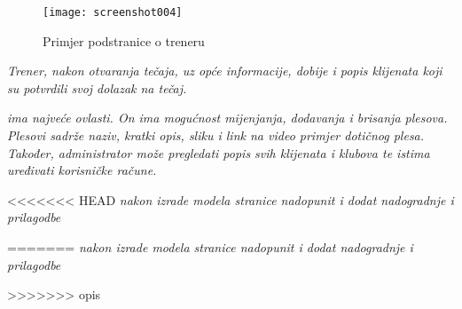 \begin{figure}[H]
	\centering
	\texttt{[image: screenshot004]}
	\caption{Primjer podstranice o treneru}
	\label{fig:screenshot004}
\end{figure}

\textit{Trener, nakon otvaranja tečaja, uz opće informacije, dobije i popis klijenata koji su potvrdili svoj dolazak na tečaj.}

\textit{ ima najveće ovlasti. On ima mogućnost mijenjanja, dodavanja i brisanja plesova. Plesovi sadrže naziv, kratki opis, sliku i link na video primjer dotičnog plesa. Također, administrator može pregledati popis svih klijenata i klubova te istima uređivati korisničke račune.}

<<<<<<< HEAD
\textit{nakon izrade modela stranice nadopunit i dodat nadogradnje i prilagodbe}
		
=======
\textit{nakon izrade modela stranice nadopunit i dodat nadogradnje i prilagodbe} 		
	
>>>>>>> opis
